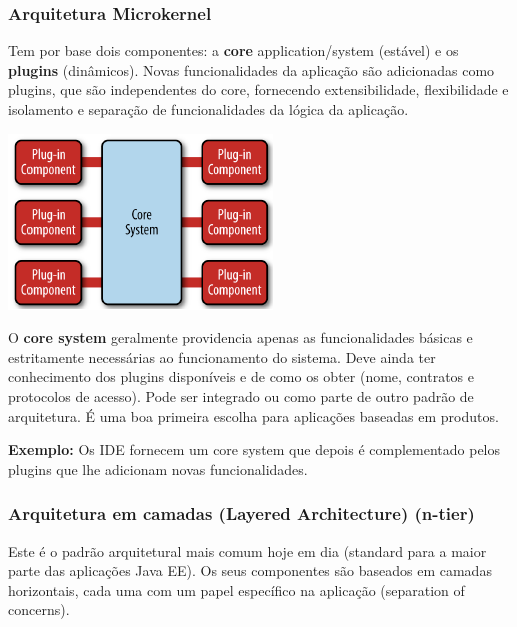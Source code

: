 \documentclass{article}
\begin{document}
\pagebreak

\subsubsection{Arquitetura Microkernel}

Tem por base dois componentes: a \textbf{core} application/system (estável) e os \textbf{plugins} (dinâmicos).
Novas funcionalidades da aplicação são adicionadas como plugins, que são
independentes do core, fornecendo extensibilidade, flexibilidade e
isolamento e separação de funcionalidades da lógica da aplicação.

\begin{center}
  \includegraphics[scale=0.7]{60}
\end{center}

O \textbf{core system} geralmente providencia apenas as funcionalidades básicas
e estritamente necessárias ao funcionamento do sistema. Deve ainda ter conhecimento
dos plugins disponíveis e de como os obter (nome, contratos e protocolos de acesso).
Pode ser integrado ou como parte de outro padrão de arquitetura. É uma boa
primeira escolha para aplicações baseadas em produtos.

\vspace{2mm}

\begin{flushleft}
  \textbf{Exemplo:} Os IDE fornecem um core system que depois é complementado
  pelos plugins que lhe adicionam novas funcionalidades.
\end{flushleft}

\subsubsection{Arquitetura em camadas (Layered Architecture) (n-tier)}

Este é o padrão arquitetural mais comum hoje em dia (standard para a
maior parte das aplicações Java EE). Os seus componentes são baseados em
camadas horizontais, cada uma com um papel específico na aplicação
(separation of concerns).
\end{document}
